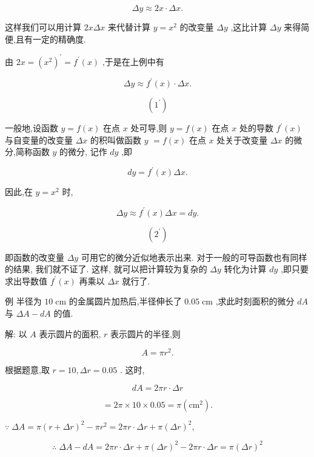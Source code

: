 \documentclass[lang=cn,newtx,10pt,scheme=chinese]{elegantbook}
\begin{document}
\[
{\Delta y} \approx {2x} \cdot {\Delta x}.
\]

这样我们可以用计算 \({2x\Delta x}\) 来代替计算 \(y = {x}^{2}\) 的改变量 \({\Delta y}\) ,这比计算 \({\Delta y}\) 来得简便,且有一定的精确度.

由 \({2x} = {\left( {x}^{2}\right) }^{\prime } = {f}^{\prime }\left( x\right)\) ,于是在上例中有

\[
{\Delta y} \approx {f}^{\prime }\left( x\right) \cdot {\Delta x}.
\]

\[
\left( {1}^{\prime }\right)
\]

一般地,设函数 \(y = f\left( x\right)\) 在点 \(x\) 处可导,则 \(y = f\left( x\right)\) 在点 \(x\) 处的导数 \({f}^{\prime }\left( x\right)\) 与自变量的改变量 \({\Delta x}\) 的积叫做函数 \(y\) \(= f\left( x\right)\) 在点 \(x\) 处关于改变量 \({\Delta x}\) 的微分,简称函数 \(y\) 的微分, 记作 \({dy}\) ,即

\[
{dy} = {f}^{\prime }\left( x\right) {\Delta x}. \tag{2}
\]

因此,在 \(y = {x}^{2}\) 时,

\[
{\Delta y} \approx {f}^{\prime }\left( x\right) {\Delta x} = {dy}.
\]

\[
\left( {2}^{\prime }\right)
\]

即函数的改变量 \({\Delta y}\) 可用它的微分近似地表示出来. 对于一般的可导函数也有同样的结果, 我们就不证了. 这样, 就可以把计算较为复杂的 \({\Delta y}\) 转化为计算 \({dy}\) ,即只要求出导数值 \({f}^{\prime }\left( x\right)\) 再乘以 \({\Delta x}\) 就行了.

例 半径为 \({10}\mathrm{\;{cm}}\) 的金属圆片加热后,半径伸长了 \({0.05}\mathrm{\;{cm}}\) ,求此时刻面积的微分 \({dA}\) 与 \({\Delta A} - {dA}\) 的值.

解: 以 \(A\) 表示圆片的面积, \(r\) 表示圆片的半径,则

\[
A = \pi {r}^{2}.
\]

根据题意,取 \(r = {10},{\Delta r} = {0.05}\) . 这时,

\[
{dA} = {2\pi r} \cdot {\Delta r}
\]

\[
= {2\pi } \times {10} \times {0.05} = \pi \left( {\mathrm{{cm}}}^{2}\right) \text{.}
\]

\(\because \;{\Delta A} = \pi {\left( r + \Delta r\right) }^{2} - \pi {r}^{2} = {2\pi r} \cdot {\Delta r} + \pi {\left( \Delta r\right) }^{2},\)

\[
\therefore \;{\Delta A} - {dA} = {2\pi r} \cdot {\Delta r} + \pi {\left( \Delta r\right) }^{2} - {2\pi r} \cdot {\Delta r} = \pi {\left( \Delta r\right) }^{2}
\]
\end{document}
